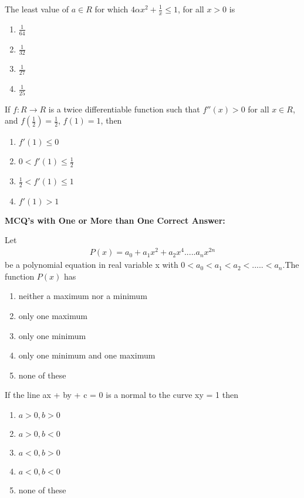 \item The least value of $a \in R$ for which $4\alpha x^2 + \frac{1}{x} \leq 1$, for all $x > 0$ is
\begin{enumerate}
\item $\frac{1}{64}$
\item $\frac{1}{32}$
\item $\frac{1}{27}$
\item $\frac{1}{25}$
\end{enumerate}

\item If $f: R \to R$ is a twice differentiable function such that $f''(x) > 0$ for all $x \in R$, and 
$f(\frac{1}{2}) = \frac{1}{2}$, $f(1) = 1$, then
\begin{enumerate}
\item $f'(1) \leq 0$
\item $0 < f'(1) \leq \frac{1}{2}$
\item $\frac{1}{2} < f'(1) \leq 1$
\item $f'(1) > 1$
\end{enumerate}

\textbf{MCQ's with One or More than One Correct Answer:}

\item Let 
\begin{align*}
P(x) = a_0 + a_1x^2 + a_2x^4.....a_nx^{2n}
\end{align*}
 be a polynomial equation in real variable x with 
$0 < a_0 < a_1 < a_2 < ..... < a_n$.The function $P(x)$ has
\begin{enumerate}
\item neither a maximum nor a minimum 
\item only one maximum 
\item only one minimum 
\item only one minimum and one maximum
\item none of these
\end{enumerate}

\item If the line ax + by + c = 0 is a normal to the curve xy = 1 then 
\begin{enumerate}
\item $a > 0, b > 0$
\item $a > 0, b < 0$
\item $a < 0, b > 0$
\item $a < 0, b < 0$
\item none of these
\end{enumerate}

